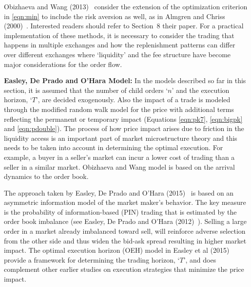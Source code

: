 Obizhaeva and Wang (2013)~\cite{obizhaeva} consider the extension of the optimization criterion in \eqref{eqn:min} to include the risk aversion as well, as in Almgren and Chriss (2000)~\cite{alm2000}. Interested readers should refer to Section~8 their paper. For a practical implementation of these methods, it is necessary to consider the trading that happens in multiple exchanges and how the replenishment patterns can differ over different exchanges where `liquidity' and the fee structure have become major considerations for the order flow. 


\noindent\textbf{Easley, De Prado and O'Hara Model:} In the models described so far in this section, it is assumed that the number of child orders `$n$' and the execution horizon, `$T$', are decided exogenously. Also the impact of a trade is modeled through the modified random walk model for the price with additional terms reflecting the permanent or temporary impact (Equations \ref{eqn:pk7}, \ref{eqn:bigpk} and \ref{eqn:pdouble}). The process of how price impact arises due to friction in the liquidity access is an important part of market microstructure theory and this needs to be taken into account in determining the optimal execution. For example, a buyer in a seller's market can incur a lower cost of trading than a seller in a similar market. Obizhaeva and Wang model is based on the arrival dynamics to the order book. 


The approach taken by Easley, De Prado and O'Hara (2015)~\cite{prado2} is based on an asymmetric information model of the market maker's behavior. The key measure is the probability of information-based (PIN) trading that is estimated by the order book imbalance (see Easley, De Prado and O'Hara (2012)~\cite{prado3}). Selling a large order in a market already imbalanced toward sell, will reinforce adverse selection from the other side and thus widen the bid-ask spread resulting in higher market impact. The optimal execution horizon (OEH) model in Easley et al (2015) provide a framework for determining the trading horizon, `$T$', and does complement other earlier studies on execution strategies that minimize the price impact. 


